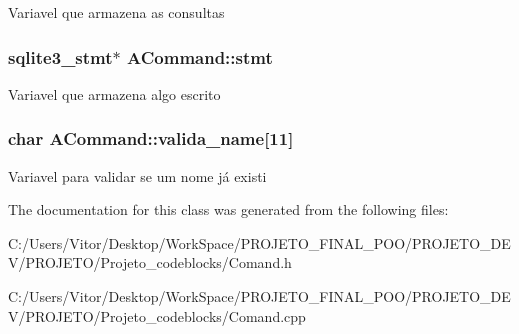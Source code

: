 Variavel que armazena as consultas \hypertarget{class_a_command_a7ecdb33c925dc75b9538a4009ff88c6c}{
\subsubsection[{stmt}]{\setlength{\rightskip}{0pt plus 5cm}sqlite3\-\_\-stmt$\ast$ A\-Command\-::stmt\hspace{0.3cm}{\ttfamily [protected]}}}\label{class_a_command_a7ecdb33c925dc75b9538a4009ff88c6c}
Variavel que armazena algo escrito \hypertarget{class_a_command_a92ecbf13bd3238cd74125505954d211f}{
\subsubsection[{valida\-\_\-name}]{\setlength{\rightskip}{0pt plus 5cm}char A\-Command\-::valida\-\_\-name\mbox{[}11\mbox{]}\hspace{0.3cm}{\ttfamily [protected]}}}\label{class_a_command_a92ecbf13bd3238cd74125505954d211f}
Variavel para validar se um nome já existi 

The documentation for this class was generated from the following files\-:\begin{DoxyCompactItemize}
\item 
C\-:/\-Users/\-Vitor/\-Desktop/\-Work\-Space/\-P\-R\-O\-J\-E\-T\-O\-\_\-\-F\-I\-N\-A\-L\-\_\-\-P\-O\-O/\-P\-R\-O\-J\-E\-T\-O\-\_\-\-D\-E\-V/\-P\-R\-O\-J\-E\-T\-O/\-Projeto\-\_\-codeblocks/Comand.\-h\item 
C\-:/\-Users/\-Vitor/\-Desktop/\-Work\-Space/\-P\-R\-O\-J\-E\-T\-O\-\_\-\-F\-I\-N\-A\-L\-\_\-\-P\-O\-O/\-P\-R\-O\-J\-E\-T\-O\-\_\-\-D\-E\-V/\-P\-R\-O\-J\-E\-T\-O/\-Projeto\-\_\-codeblocks/Comand.\-cpp\end{DoxyCompactItemize}
